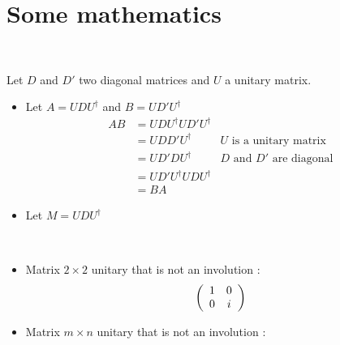 \section{Some mathematics}

~

Let $D$ and $D'$ two diagonal matrices and $U$ a unitary matrix.

\begin{itemize}
  \item Let $A = UDU^\dagger$ and $B=UD'U^\dagger$
    \begin{align*}
      AB &= UDU^\dagger UD'U^\dagger \\
        &= UDD'U^\dagger & \text{$U$ is a unitary matrix} \\
        &= UD'DU^\dagger & \text{$D$ and $D'$ are diagonal} \\
        &= UD'U^\dagger UDU^\dagger \\
        &= BA
    \end{align*}

  \item Let $M = UDU^\dagger$
\end{itemize}

~

\begin{itemize}
  \item Matrix $2\times 2$ unitary that is not an involution :
    \begin{align*}
      \left(
      \begin{array}{c c}
        1 & 0\\
        0 & i\\
      \end{array}
      \right)
    \end{align*}
  \item Matrix $m\times n$ unitary that is not an involution :

\end{itemize}
